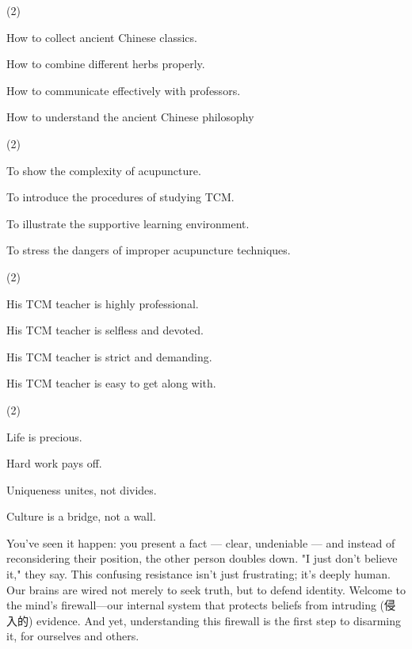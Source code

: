 \documentclass{英语试卷}
\begin{document}
\begin{choices}(2)
  \item How to collect ancient Chinese classics.
  \item How to combine different herbs properly.
  \item How to communicate effectively with professors.
  \item How to understand the ancient Chinese philosophy
\end{choices}
\begin{choices}(2)
  \item To show the complexity of acupuncture.
  \item To introduce the procedures of studying TCM.
  \item To illustrate the supportive learning environment.
  \item To stress the dangers of improper acupuncture techniques.
\end{choices}
\begin{choices}(2)
  \item His TCM teacher is highly professional.
  \item His TCM teacher is selfless and devoted.
  \item His TCM teacher is strict and demanding.
  \item His TCM teacher is easy to get along with.
\end{choices}
\begin{choices}(2)
  \item Life is precious.
  \item Hard work pays off.
  \item Uniqueness unites, not divides.
  \item Culture is a bridge, not a wall.
\end{choices}
\par You've seen it happen: you present a fact — clear, undeniable — and instead of reconsidering their position, the other person doubles down. "I just don't believe it," they say. This confusing resistance isn't just frustrating; it's deeply human. Our brains are wired not merely to seek truth, but to defend identity. Welcome to the mind's firewall—our internal system that protects beliefs from intruding (侵入的) evidence. And yet, understanding this firewall is the first step to disarming it, for ourselves and others.\par
\end{document}
